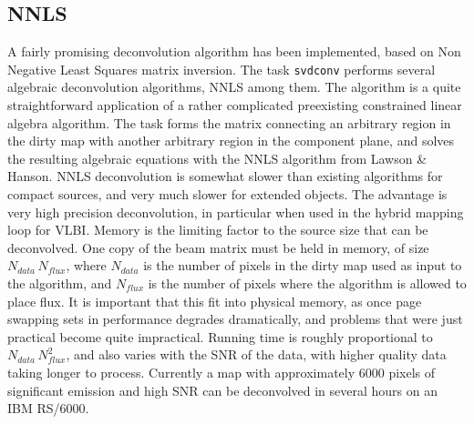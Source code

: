 \subsection{NNLS}

A fairly promising deconvolution algorithm has been implemented, based on
Non Negative Least Squares matrix inversion.  The task {\tt svdconv}
performs several algebraic deconvolution algorithms, NNLS among them.  The
algorithm is a quite straightforward application of a rather complicated
preexisting constrained linear algebra algorithm.  The task forms the
matrix connecting an arbitrary region in the dirty map with another
arbitrary region in the component plane, and solves the resulting algebraic
equations with the NNLS algorithm from Lawson \& Hanson.  NNLS deconvolution
is somewhat slower than existing algorithms for compact sources, and very
much slower for extended objects.  The advantage is very high precision
deconvolution, in particular when used in the hybrid mapping loop for
VLBI.  Memory is the limiting factor to the source size that can be
deconvolved.  One copy of the beam matrix must be held in memory, of size
$N_{data}\,N_{flux}$, where $N_{data}$ is the number of pixels in the dirty
map used as input to the algorithm, and $N_{flux}$ is the number of pixels
where the algorithm is allowed to place flux.  It is important that this
fit into physical memory, as once page swapping sets in performance
degrades dramatically, and problems that were just practical become quite
impractical.  Running time is roughly proportional to
$N_{data}\,N_{flux}^2$, and also varies with the SNR of the data, with
higher quality data taking longer to process.  Currently a map with
approximately 6000 pixels of significant emission and high SNR can be
deconvolved in several hours on an IBM RS/6000.

